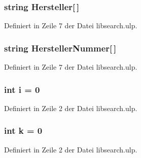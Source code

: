 \hypertarget{libsearch_8ulp_a03dd05fe151d0e9f9edf96078bc234d4}{}
\subsubsection[{Hersteller}]{\setlength{\rightskip}{0pt plus 5cm}string Hersteller\mbox{[}$\,$\mbox{]}}\label{libsearch_8ulp_a03dd05fe151d0e9f9edf96078bc234d4}


Definiert in Zeile 7 der Datei libsearch.\+ulp.

\hypertarget{libsearch_8ulp_a6ba91b18d0979e207105d660a2010d8d}{}
\subsubsection[{Hersteller\+Nummer}]{\setlength{\rightskip}{0pt plus 5cm}string Hersteller\+Nummer\mbox{[}$\,$\mbox{]}}\label{libsearch_8ulp_a6ba91b18d0979e207105d660a2010d8d}


Definiert in Zeile 7 der Datei libsearch.\+ulp.

\hypertarget{libsearch_8ulp_acb559820d9ca11295b4500f179ef6392}{}
\subsubsection[{i}]{\setlength{\rightskip}{0pt plus 5cm}int i = 0}\label{libsearch_8ulp_acb559820d9ca11295b4500f179ef6392}


Definiert in Zeile 2 der Datei libsearch.\+ulp.

\hypertarget{libsearch_8ulp_ab66ed8e0098c0a86b458672a55a9cca9}{}
\subsubsection[{k}]{\setlength{\rightskip}{0pt plus 5cm}int k = 0}\label{libsearch_8ulp_ab66ed8e0098c0a86b458672a55a9cca9}


Definiert in Zeile 2 der Datei libsearch.\+ulp.

\hypertarget{libsearch_8ulp_a44dc1eefd5382033cf032f578a0130b9}{}
